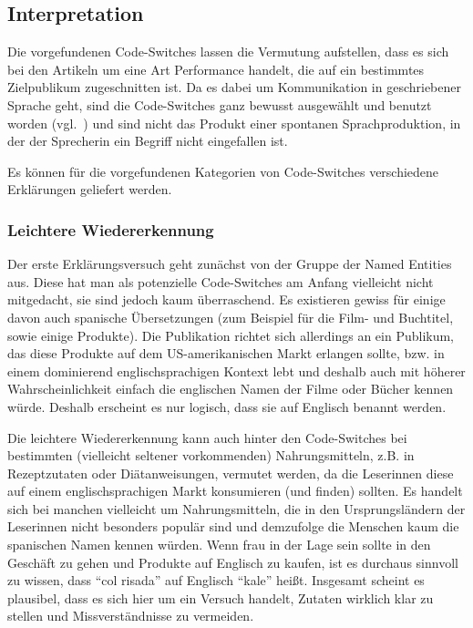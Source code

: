 \subsection{Interpretation}
\label{chap:results-analysis}

Die vorgefundenen Code-Switches lassen die Vermutung aufstellen, dass es sich bei den Artikeln um eine Art Performance handelt, die auf ein bestimmtes Zielpublikum zugeschnitten ist.
Da es dabei um Kommunikation in geschriebener Sprache geht, sind die Code-Switches ganz bewusst ausgewählt und benutzt worden (vgl.~\cite{Mahootian05}) und sind nicht das Produkt einer spontanen Sprachproduktion, in der der Sprecherin ein Begriff nicht eingefallen ist.

Es können für die vorgefundenen Kategorien von Code-Switches verschiedene Erklärungen geliefert werden.

\subsubsection{Leichtere Wiedererkennung}
Der erste Erklärungsversuch geht zunächst von der Gruppe der Named Entities aus.
Diese hat man als potenzielle Code-Switches am Anfang vielleicht nicht mitgedacht, sie sind jedoch kaum überraschend.
Es existieren gewiss für einige davon auch spanische Übersetzungen (zum Beispiel für die Film- und Buchtitel, sowie einige Produkte).
Die Publikation richtet sich allerdings an ein Publikum, das diese Produkte auf dem US-amerikanischen Markt erlangen sollte, bzw. in einem dominierend englischsprachigen Kontext lebt und deshalb auch mit höherer Wahrscheinlichkeit einfach die englischen Namen der Filme oder Bücher kennen würde.
Deshalb erscheint es nur logisch, dass sie auf Englisch benannt werden.

Die leichtere Wiedererkennung kann auch hinter den Code-Switches bei bestimmten (vielleicht seltener vorkommenden) Nahrungsmitteln, z.B. in Rezeptzutaten oder Diätanweisungen, vermutet werden, da die Leserinnen diese auf einem englischsprachigen Markt konsumieren (und finden) sollten.
Es handelt sich bei manchen vielleicht um Nahrungsmitteln, die in den Ursprungsländern der Leserinnen nicht besonders populär sind und demzufolge die Menschen kaum die spanischen Namen kennen würden.
Wenn frau in der Lage sein sollte in den Geschäft zu gehen und Produkte auf Englisch zu kaufen, ist es durchaus sinnvoll zu wissen, dass ``col risada'' auf Englisch ``kale'' heißt.
Insgesamt scheint es plausibel, dass es sich hier um ein Versuch handelt, Zutaten wirklich klar zu stellen und Missverständnisse zu vermeiden.

